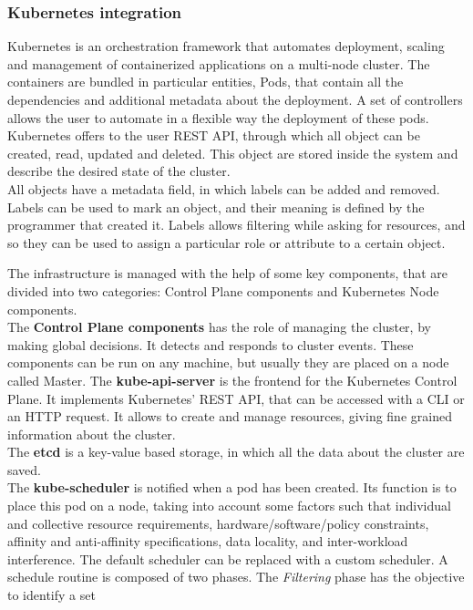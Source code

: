 \subsubsection*{Kubernetes integration}
Kubernetes is an orchestration framework that automates deployment, scaling and management of containerized
applications on a multi-node cluster.
The containers are bundled in particular entities, Pods, that contain all the dependencies and 
additional metadata about the deployment. A set of controllers allows the user to automate
in a flexible way the deployment of these pods.
\\
Kubernetes offers to the user REST API, through which all object can be created, read, updated
and deleted. This object are stored inside the system and describe the desired state of the cluster.
\\
All objects have a metadata field, in which labels can be added and removed.
Labels can be used to mark an object, and their meaning is defined by the programmer that created it.
Labels allows filtering while asking for resources, and so they can be used to assign a particular role 
or attribute to a certain object.
\par
The infrastructure is managed with the help of some key components, that are divided into two categories:
Control Plane components and Kubernetes Node components.
\\
The \textbf{Control Plane components} has the role of managing the cluster, by making global decisions.
It detects and responds to cluster events. These components can be run on any machine, but usually
they are placed on a node called Master.
The \textbf{kube-api-server} is the frontend for the Kubernetes Control Plane. It implements Kubernetes'
REST API, that can be accessed with a CLI or an HTTP request. It allows to create and manage resources,
giving fine grained information about the cluster.
\\
The \textbf{etcd} is a key-value based storage, in which all the data about the cluster are saved.
\\
The \textbf{kube-scheduler} is notified when a pod has been created. Its function is to place this pod
on a node, taking into account some factors such that individual and collective resource
requirements, hardware/software/policy constraints, affinity and anti-affinity specifications,
data locality, and inter-workload interference.
The default scheduler can be replaced with a custom scheduler. A schedule routine
is composed of two phases. The \textit{Filtering} phase has the objective to identify a set 
